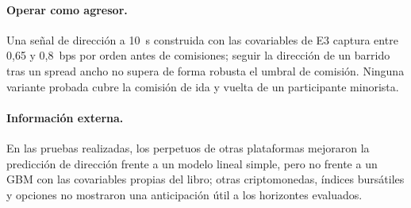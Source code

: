 \paragraph{Operar como agresor.} Una señal de dirección a 10~s construida con las covariables de E3 captura entre 0,65 y 0,8~bps por orden antes de comisiones; seguir la dirección de un barrido tras un spread ancho no supera de forma robusta el umbral de comisión. Ninguna variante probada cubre la comisión de ida y vuelta de un participante minorista.

\paragraph{Información externa.} En las pruebas realizadas, los perpetuos de otras plataformas mejoraron la predicción de dirección frente a un modelo lineal simple, pero no frente a un GBM con las covariables propias del libro; otras criptomonedas, índices bursátiles y opciones no mostraron una anticipación útil a los horizontes evaluados.

